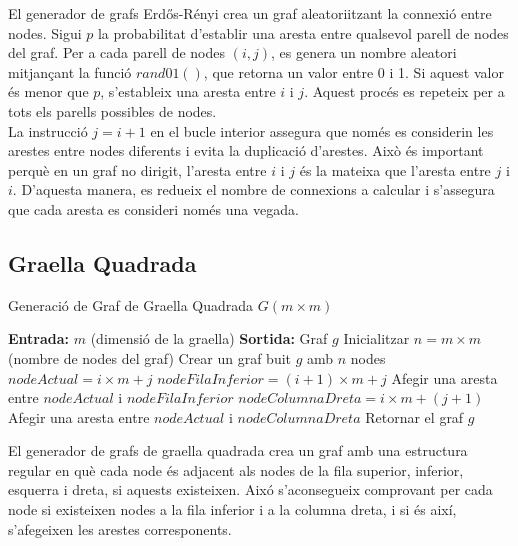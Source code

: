 \documentclass[a4paper]{article}
\begin{document}
	El generador de grafs Erdős-Rényi crea un graf aleatoriitzant la connexió entre nodes. Sigui $p$ la probabilitat d'establir una aresta entre qualsevol parell de nodes del graf. Per a cada parell de nodes $(i, j)$, es genera un nombre aleatori mitjançant la funció $rand01()$, que retorna un valor entre 0 i 1. Si aquest valor és menor que $p$, s'estableix una aresta entre $i$ i $j$. Aquest procés es repeteix per a tots els parells possibles de nodes. \\
	
	La instrucció $j = i + 1$ en el bucle interior assegura que només es considerin les arestes entre nodes diferents i evita la duplicació d'arestes. Això és important perquè en un graf no dirigit, l'aresta entre $i$ i $j$ és la mateixa que l'aresta entre $j$ i $i$. D'aquesta manera, es redueix el nombre de connexions a calcular i s'assegura que cada aresta es consideri només una vegada. \\
	
	\subsection{Graella Quadrada}

	\begin{algorithm} [H]
		\caption{Generació de Graf de Graella Quadrada $G(m \times m)$}
		\begin{algorithmic} [1]
			\Statex \textbf{Entrada:} $m$ (dimensió de la graella)
			\Statex \textbf{Sortida:} Graf $g$ 
			\Statex \vspace{-0.25em}
			\State Inicialitzar $n = m \times m$ (nombre de nodes del graf)
			\State Crear un graf buit $g$ amb $n$ nodes
					\State $nodeActual = i \times m + j$
						\State $nodeFilaInferior = (i + 1) \times m + j$
						\State Afegir una aresta entre $nodeActual$ i $nodeFilaInferior$
					\EndIf
						\State $nodeColumnaDreta = i \times m + (j + 1)$
						\State Afegir una aresta entre $nodeActual$ i $nodeColumnaDreta$
					\EndIf
				\EndFor
			\EndFor
			\State Retornar el graf $g$
		\end{algorithmic}
	\end{algorithm}

	El generador de grafs de graella quadrada crea un graf amb una estructura regular en què cada node és adjacent als nodes de la fila superior, inferior, esquerra i dreta, si aquests existeixen. Aixó s'aconsegueix comprovant per cada node si existeixen nodes a la fila inferior i a la columna dreta, i si és així, s'afegeixen les arestes corresponents. \\
\end{document}
